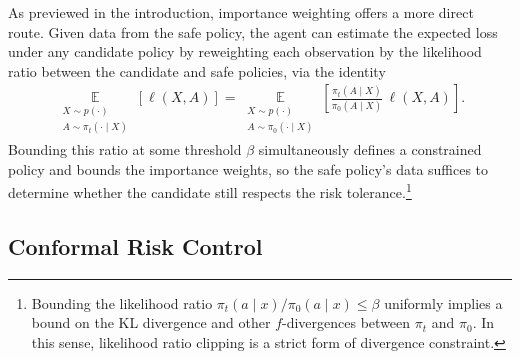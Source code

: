 As previewed in the introduction, importance weighting offers a more direct route. Given data from the safe policy, the agent can estimate the expected loss under any candidate policy by reweighting each observation by the likelihood ratio between the candidate and safe policies, via the identity
\begin{align*}
    \operatorname*{\mathbb{E}}_{\substack{X \sim p(\cdot) \\ A \sim \pi_t(\cdot \mid X)}} [\ell(X, A)] = \operatorname*{\mathbb{E}}_{\substack{X \sim p(\cdot) \\ A \sim \pi_0(\cdot \mid X)}} \left[ \frac{\pi_t(A \mid X)}{\pi_0(A \mid X)} \, \ell(X, A) \right].
\end{align*}
Bounding this ratio at some threshold $\beta$ simultaneously defines a constrained policy and bounds the importance weights, so the safe policy's data suffices to determine whether the candidate still respects the risk tolerance.\footnote{Bounding the likelihood ratio $\pi_t(a \mid x) / \pi_0(a \mid x) \leq \beta$ uniformly implies a bound on the KL
  divergence and other $f$-divergences between $\pi_t$ and $\pi_0$. In this sense, likelihood ratio clipping is a strict form of
   divergence constraint.}

\subsection{Conformal Risk Control}

